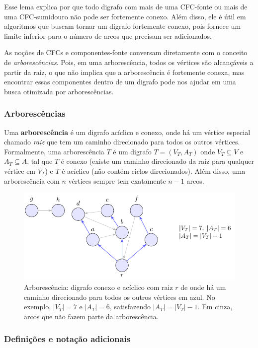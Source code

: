 Esse lema explica por que todo digrafo com mais de uma CFC-fonte ou mais de uma CFC-sumidouro não pode ser fortemente conexo. Além disso, ele é útil em algoritmos que buscam tornar um digrafo fortemente conexo, pois fornece um limite inferior para o número de arcos que precisam ser adicionados.


As noções de CFCs e componentes-fonte conversam diretamente com o conceito de \emph{arborescências}. Pois, em uma arborescência, todos os vértices são alcançáveis a partir da raiz, o que não implica que a arborescência é fortemente conexa, mas encontrar essas componentes dentro de um digrafo pode nos ajudar em uma busca otimizada por arborescências.

\subsubsection{Arborescências}

Uma \textbf{arborescência} é um digrafo acíclico e conexo, onde há um vértice especial chamado \emph{raiz} que tem um caminho direcionado para todos os outros vértices. Formalmente, uma arborescência \(T\) é um digrafo \(T = (V_T, A_T)\) onde \(V_T \subseteq V\) e \(A_T \subseteq A\), tal que \(T\) é conexo (existe um caminho direcionado da raiz para qualquer vértice em \(V_T\)) e \(T\) é acíclico (não contém ciclos direcionados). Além disso, uma arborescência com \(n\) vértices sempre tem exatamente \(n-1\) arcos.

\begin{figure}[H]
	\centering
	\includegraphics[width=0.9\linewidth]{figures/fig_arborescencia.pdf}

	\caption{Arborescência: digrafo conexo e acíclico com raiz $r$ de onde há um caminho direcionado para todos os outros vértices em azul. No exemplo, $|V_T|=7$ e $|A_T|=6$, satisfazendo $|A_T|=|V_T|-1$. Em cinza, arcos que não fazem parte da arborescência.}
	\label{fig:arborescencia}\end{figure}


\subsubsection{Definições e notação adicionais}

